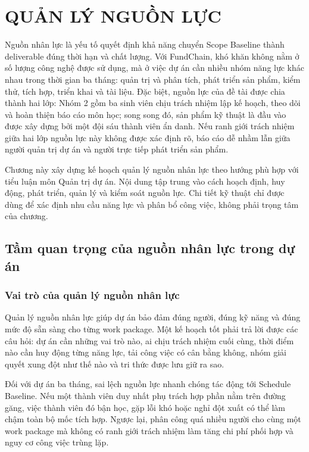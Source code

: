 \chapter{QUẢN LÝ NGUỒN LỰC}

Nguồn nhân lực là yếu tố quyết định khả năng chuyển Scope Baseline thành deliverable đúng thời hạn và chất lượng. Với FundChain, khó khăn không nằm ở số lượng công nghệ được sử dụng, mà ở việc dự án cần nhiều nhóm năng lực khác nhau trong thời gian ba tháng: quản trị và phân tích, phát triển sản phẩm, kiểm thử, tích hợp, triển khai và tài liệu. Đặc biệt, nguồn lực của đề tài được chia thành hai lớp: Nhóm 2 gồm ba sinh viên chịu trách nhiệm lập kế hoạch, theo dõi và hoàn thiện báo cáo môn học; song song đó, sản phẩm kỹ thuật là đầu vào được xây dựng bởi một đội sáu thành viên ẩn danh. Nếu ranh giới trách nhiệm giữa hai lớp nguồn lực này không được xác định rõ, báo cáo dễ nhầm lẫn giữa người quản trị dự án và người trực tiếp phát triển sản phẩm.

Chương này xây dựng kế hoạch quản lý nguồn nhân lực theo hướng phù hợp với tiểu luận môn Quản trị dự án. Nội dung tập trung vào cách hoạch định, huy động, phát triển, quản lý và kiểm soát nguồn lực. Chi tiết kỹ thuật chỉ được dùng để xác định nhu cầu năng lực và phân bổ công việc, không phải trọng tâm của chương.

\iffalse
\section{Tầm quan trọng của nguồn nhân lực trong dự án}

\subsection{Vai trò của quản lý nguồn nhân lực}

Quản lý nguồn nhân lực giúp dự án bảo đảm đúng người, đúng kỹ năng và đúng mức độ sẵn sàng cho từng work package. Một kế hoạch tốt phải trả lời được các câu hỏi: dự án cần những vai trò nào, ai chịu trách nhiệm cuối cùng, thời điểm nào cần huy động từng năng lực, tải công việc có cân bằng không, nhóm giải quyết xung đột như thế nào và tri thức được lưu giữ ra sao.

Đối với dự án ba tháng, sai lệch nguồn lực nhanh chóng tác động tới Schedule Baseline. Nếu một thành viên duy nhất phụ trách hợp phần nằm trên đường găng, việc thành viên đó bận học, gặp lỗi khó hoặc nghỉ đột xuất có thể làm chậm toàn bộ mốc tích hợp. Ngược lại, phân công quá nhiều người cho cùng một work package mà không có ranh giới trách nhiệm làm tăng chi phí phối hợp và nguy cơ công việc trùng lặp.

